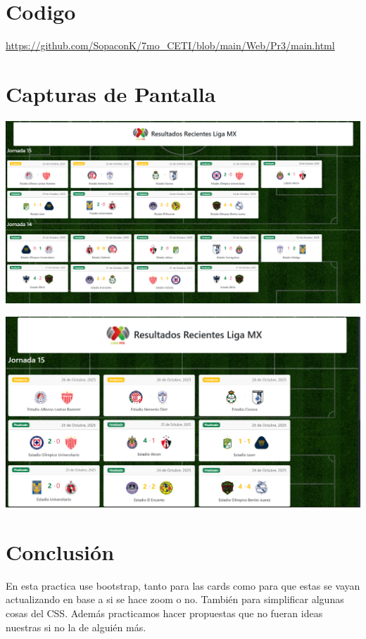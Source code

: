 \documentclass[11pt]{scrartcl}
\begin{document}
\section{Codigo}

\url{https://github.com/SopaconK/7mo_CETI/blob/main/Web/Pr3/main.html}

\section{Capturas de Pantalla}

\begin{center}
    \includegraphics[scale=0.5]{ss_1.png}
\end{center}
\begin{center}
    \includegraphics[scale=0.5]{ss_2.png}
\end{center}



\section{Conclusión}

En esta practica use bootstrap, tanto para las cards como para que estas se vayan actualizando en base a si se hace zoom o no. 
También para simplificar algunas cosas del CSS. 
Además practicamos hacer propuestas que no fueran ideas nuestras si no la de alguién más. 



    
\end{document}
